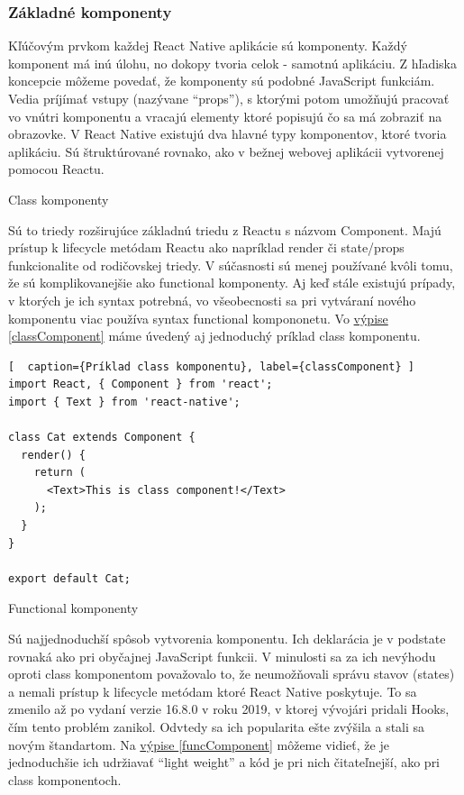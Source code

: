 \subsubsection{Základné komponenty}
Kľúčovým prvkom každej React Native aplikácie sú komponenty. Každý komponent má inú úlohu, no dokopy tvoria celok - samotnú aplikáciu. Z hľadiska koncepcie môžeme povedať, že komponenty sú podobné JavaScript funkciám. Vedia príjímať vstupy (nazývane ``props''), s ktorými potom umožňujú pracovať vo vnútri komponentu a vracajú elementy ktoré popisujú čo sa má zobraziť na obrazovke. V React Native existujú dva hlavné typy komponentov, ktoré tvoria aplikáciu. Sú štruktúrované rovnako, ako v bežnej webovej aplikácii vytvorenej pomocou Reactu.
\begin{itemize}[leftmargin=*]
{\bf \item Class komponenty} \newline
Sú to triedy rozširujúce základnú triedu z Reactu s názvom Component. Majú prístup k lifecycle metódam Reactu ako napríklad render či state/props funkcionalite od rodičovskej triedy. V súčasnosti sú menej používané kvôli tomu, že sú komplikovanejšie ako functional komponenty. Aj keď stále existujú prípady, v ktorých je ich syntax potrebná, vo všeobecnosti sa pri vytváraní nového komponentu viac používa syntax functional kompononetu. Vo \hyperref[classComponent]{výpise \ref{classComponent}} máme úvedený aj jednoduchý príklad class komponentu.  \\

\begin{lstlisting}[  caption={Príklad class komponentu}, label={classComponent} ]
import React, { Component } from 'react';
import { Text } from 'react-native';

class Cat extends Component {
  render() {
    return (
      <Text>This is class component!</Text>
    );
  }
}

export default Cat;
\end{lstlisting}
{\bf \item Functional komponenty} \newline
Sú najjednoduchší spôsob vytvorenia komponentu. Ich deklarácia je v podstate rovnaká ako pri obyčajnej JavaScript funkcii. V minulosti sa za ich nevýhodu oproti class komponentom považovalo to, že neumožňovali správu stavov (states) a nemali prístup k lifecycle metódam ktoré React Native poskytuje. To sa zmenilo až po vydaní verzie 16.8.0 v roku 2019, v ktorej vývojári pridali Hooks, čím tento problém zanikol. Odvtedy sa ich popularita ešte zvýšila a stali sa novým štandartom. Na \hyperref[funcComponent]{výpise \ref{funcComponent}} môžeme vidieť, že je jednoduchšie ich udržiavať ``light weight'' a kód je pri nich čitateľnejší, ako pri class komponentoch. \\


\end{itemize}
